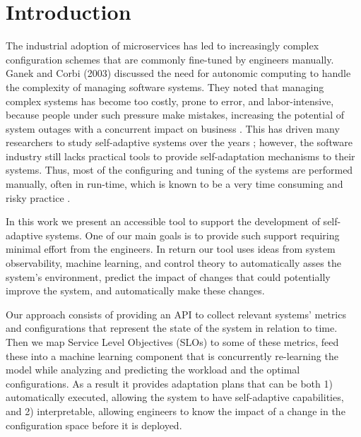 \section{Introduction}

The industrial adoption of microservices has led to increasingly complex configuration schemes that are commonly fine-tuned by engineers manually. Ganek and Corbi (2003) discussed the need for autonomic computing to handle the complexity of managing software systems. They noted that managing complex systems has become too costly, prone to error, and labor-intensive, because people under such pressure make mistakes, increasing the potential of system outages with a concurrent impact on business \cite{ganek_dawning_2003}. This has driven many researchers to study self-adaptive systems over the years \cite{porter_rex:_2016, andrew_pavlo_self-driving_2017, salehie_self-adaptive_2009, ganapathi_predicting_2009, herbst_self-adaptive_2014, faniyi_architecting_2014}; however, the software industry still lacks practical tools to provide self-adaptation mechanisms to their systems. Thus, most of the configuring and tuning of the systems are performed manually, often in run-time, which is known to be a very time consuming and risky practice \cite{ganek_dawning_2003, using_prob_reasoning_automate_software_tuning, de_lemos_software_2013}.


In this work we present an accessible tool to support the development of self-adaptive systems. One of our main goals is to provide such support requiring minimal effort from the engineers. In return our tool uses ideas from system observability, machine learning, and control theory to automatically asses the system's environment, predict the impact of changes that could potentially improve the system, and automatically make these changes.

Our approach consists of providing an API to collect relevant systems' metrics and configurations that represent the state of the system in relation to time. Then we map Service Level Objectives (SLOs) to some of these metrics, feed these into a machine learning component that is concurrently re-learning the model while analyzing and predicting the workload and the optimal configurations. As a result it provides adaptation plans that can be both 1) automatically executed, allowing the system to have self-adaptive capabilities, and 2) interpretable, allowing engineers to know the impact of a change in the configuration space before it is deployed.

